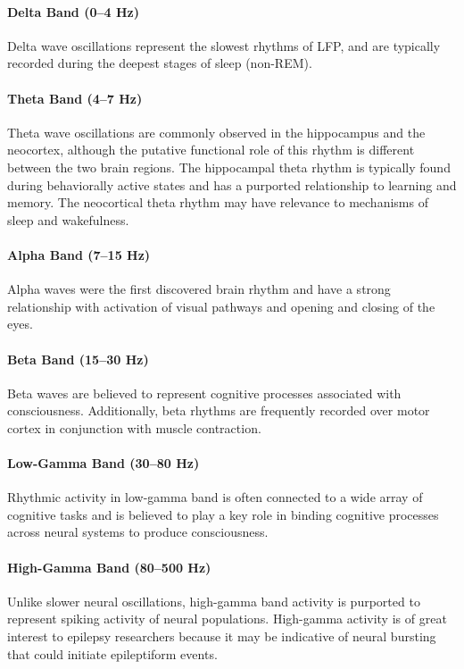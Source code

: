 \paragraph{Delta Band (0--4 Hz)}
Delta wave oscillations represent the slowest rhythms of LFP, and are typically recorded during the deepest stages of sleep (non-REM).

\paragraph{Theta Band (4--7 Hz)}
Theta wave oscillations are commonly observed in the hippocampus and the neocortex, although the putative functional role of this rhythm is different between the two brain regions. The hippocampal theta rhythm is typically found during behaviorally active states and has a purported relationship to learning and memory. The neocortical theta rhythm may have relevance to mechanisms of sleep and wakefulness.

\paragraph{Alpha Band (7--15 Hz)}
Alpha waves were the first discovered brain rhythm and have a strong relationship with activation of visual pathways and opening and closing of the eyes. 

\paragraph{Beta Band (15--30 Hz)}
Beta waves are believed to represent cognitive processes associated with consciousness. Additionally, beta rhythms are frequently recorded over motor cortex in conjunction with muscle contraction.

\paragraph{Low-Gamma Band (30--80 Hz)}
Rhythmic activity in low-gamma band is often connected to a wide array of cognitive tasks and is believed to play a key role in binding cognitive processes across neural systems to produce consciousness. 

\paragraph{High-Gamma Band (80--500 Hz)} 
Unlike slower neural oscillations, high-gamma band activity is purported to represent spiking activity of neural populations. High-gamma activity is of great interest to epilepsy researchers because it may be indicative of neural bursting that could initiate epileptiform events.

